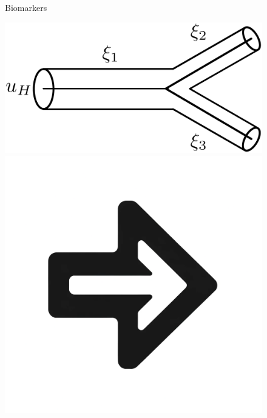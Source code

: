 \documentclass{beamer}
\begin{document}
\begin{frame}
\begin{figure}[htbp]
\begin{minipage}[t][0.06\paperheight][t]{\linewidth}
\begin{minipage}{0.19\linewidth}
				\caption*{\tiny Biomarkers}
			\end{minipage}
			\begin{minipage}{0.1\linewidth}
				\caption*{\tiny}
			\end{minipage}
		\end{minipage}
		\begin{minipage}[c][0.35\paperheight][c]{\linewidth}
			\begin{minipage}{0.19\linewidth}
				\includegraphics[width=\linewidth]{images/bifurcation.eps}
			\end{minipage}
			\begin{minipage}{0.1\linewidth}
				\includegraphics[width=\linewidth]{images/right_arrow.png}

\end{minipage}
\end{minipage}
\end{figure}
\end{frame}
\end{document}
